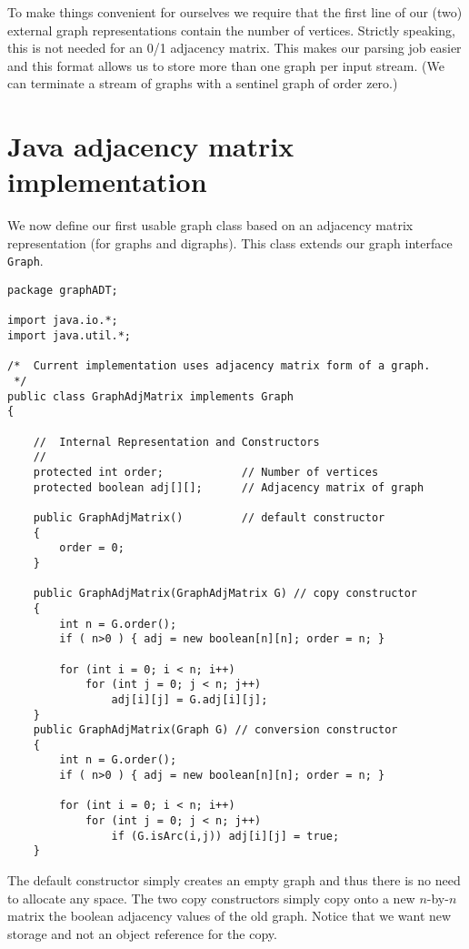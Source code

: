 To make things convenient for ourselves we require that the first line of
our (two) external graph representations contain the number of vertices.
Strictly speaking, this is not needed for an 0/1 adjacency matrix.
This makes our parsing job easier and this  format allows us to store
more than one graph per input stream. (We can terminate a stream of
graphs with a sentinel graph of order zero.)

\section{Java adjacency matrix implementation}

We now define our first usable graph class based on an adjacency matrix
representation (for graphs and digraphs). This class extends our graph
interface \verb|Graph|.

{\renewcommand{\ttdefault}{pcr} %
\footnotesize \begin{verbatim}
package graphADT;

import java.io.*;
import java.util.*;

/*  Current implementation uses adjacency matrix form of a graph.
 */
public class GraphAdjMatrix implements Graph
{

    //  Internal Representation and Constructors
    //
    protected int order;            // Number of vertices
    protected boolean adj[][];      // Adjacency matrix of graph

    public GraphAdjMatrix()         // default constructor
    {
        order = 0;
    }

    public GraphAdjMatrix(GraphAdjMatrix G) // copy constructor
    {
        int n = G.order();
        if ( n>0 ) { adj = new boolean[n][n]; order = n; }

        for (int i = 0; i < n; i++)
            for (int j = 0; j < n; j++)
                adj[i][j] = G.adj[i][j];
    }
    public GraphAdjMatrix(Graph G) // conversion constructor
    {
        int n = G.order();
        if ( n>0 ) { adj = new boolean[n][n]; order = n; }

        for (int i = 0; i < n; i++)
            for (int j = 0; j < n; j++)
                if (G.isArc(i,j)) adj[i][j] = true;
    }
\end{verbatim}%
}


The default constructor simply creates an empty graph and thus there is 
no need to allocate any space.  The two copy constructors simply copy 
onto a new $n$-by-$n$ matrix the boolean adjacency values of the old graph.  
Notice that we want new storage and not an object reference for the copy.\\

